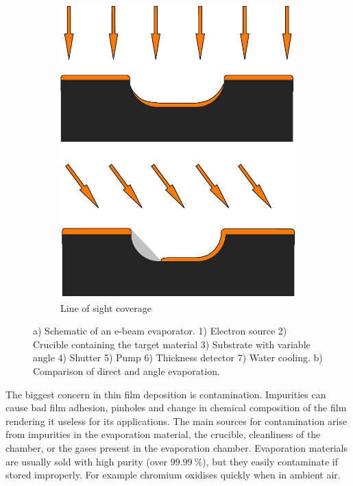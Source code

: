 \documentclass[final]{jyflluk}
\begin{document}
\begin{figure}[h]
\begin{subfigure}{0.35\textwidth}
        \includegraphics[width=\linewidth]{images/angle_evap.pdf} 
        \vspace{0.6cm}
        \caption{Line of sight coverage} \label{fig:angle_evap}
    \end{subfigure}
    \caption{a) Schematic of an e-beam evaporator. 1) Electron source 2) Crucible containing the target material 3) Substrate with variable angle 4) Shutter 5) Pump 6) Thickness detector 7) Water cooling. b) Comparison of direct and angle evaporation. } \label{fig:evap}
\end{figure}



The biggest concern in thin film deposition is contamination. Impurities can cause bad film adhesion, pinholes and change in chemical composition of the film rendering it useless for its applications. The main sources for contamination arise from impurities in the evaporation material, the crucible, cleanliness of the chamber, or the gases present in the evaporation chamber. Evaporation materials are usually sold with high purity (over $\SI{99.99}{\percent}$), but they easily contaminate if stored improperly. For example chromium oxidises quickly when in ambient air. 
\end{document}
